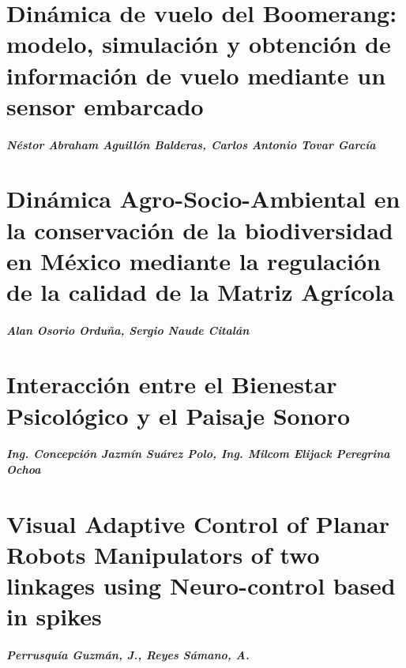     \chapter{Dinámica de vuelo del Boomerang: modelo, simulación y obtención de información de vuelo mediante un sensor embarcado}
    \paragraph{Néstor Abraham Aguillón Balderas, Carlos Antonio Tovar García}
    

    \chapter{Dinámica Agro-Socio-Ambiental en la conservación de la biodiversidad en México mediante la regulación de la calidad de la Matriz Agrícola}
    \paragraph{Alan Osorio Orduña, Sergio Naude Citalán}
    

    \chapter{Interacción entre el Bienestar Psicológico y el Paisaje Sonoro}
    \paragraph{Ing. Concepción Jazmín Suárez Polo, Ing. Milcom Elijack Peregrina Ochoa}
    

    \chapter{Visual Adaptive Control of Planar Robots Manipulators of two linkages using Neuro-control based in spikes}
    \paragraph{Perrusqu\'ia Guzm\'an, J., Reyes S\'amano, A.}





